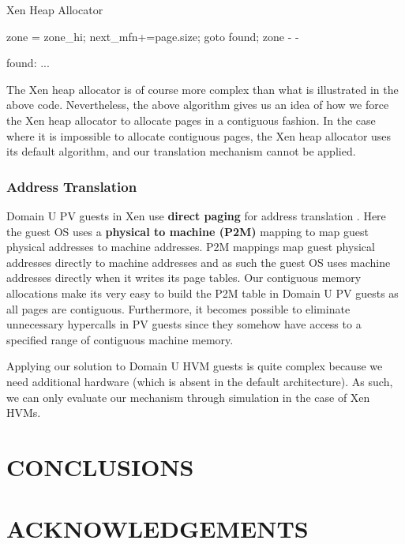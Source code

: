 \documentclass[sigconf]{sigplanconf}
\begin{document}
  \newpage
  \begin{algorithm}  
  	\caption{Xen Heap Allocator} 
  	\label{cont_aware}
  	\begin{algorithmic}[5]  
  		\Statex  
  	
  		\State zone = zone\_hi;
  		\State next\_mfn+=page.size;
  		\State goto found;
  		\EndIf
  		\EndFor
  		\EndIf  
  		\EndFor
  		\State zone - -
  		\EndWhile
  		
  		\State found: ...
  		\EndFunction  
  	\end{algorithmic}  
  \end{algorithm}
  
  The Xen heap allocator is of course more complex than what is illustrated in the above code. Nevertheless, the above algorithm gives us an idea of how we force the Xen heap allocator to allocate pages in a contiguous fashion. In the case where it is impossible to allocate contiguous pages, the Xen heap allocator uses its default algorithm, and our translation mechanism cannot be applied. 
  
  \subsubsection{Address Translation}
  Domain U PV guests in Xen use \textbf{direct paging} for address translation \cite{xenorg}. Here the guest OS uses a \textbf{physical to machine (P2M)} mapping to map guest physical addresses to machine addresses. P2M mappings map guest physical addresses directly to machine addresses and as such the guest OS uses machine addresses directly when it writes its page tables. Our contiguous memory allocations make its very easy to build the P2M table in Domain U PV guests as all pages are contiguous. Furthermore, it becomes possible to eliminate unnecessary hypercalls in PV guests since they somehow have access to a specified range of contiguous machine memory.
  
  Applying our solution to Domain U HVM guests is quite complex because we need additional hardware (which is absent in the default architecture). As such, we can only evaluate our mechanism through simulation in the case of Xen HVMs. 
      
         
 \section{CONCLUSIONS}
 \lipsum[3]
 \section{ACKNOWLEDGEMENTS}
 \lipsum[3]
\printbibliography
\end{document}
